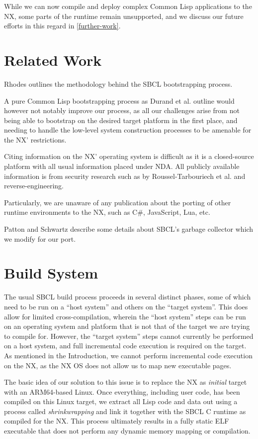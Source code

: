 \documentclass[format=sigconf]{acmart}
\begin{document}
While we can now compile and deploy complex Common Lisp applications to the NX, some parts of the runtime remain unsupported, and we discuss our future efforts in this regard in \autoref{further-work}.

\section{Related Work}\label{relatedwork}
Rhodes\cite{rhodes2008sbcl} outlines the methodology behind the SBCL bootstrapping process.

A pure Common Lisp bootstrapping process as Durand et al.\cite{durand2019bootstrapping} outline would however not notably improve our process, as all our challenges arise from not being able to bootstrap on the desired target platform in the first place, and needing to handle the low-level system construction processes to be amenable for the NX' restrictions.

Citing information on the NX' operating system is difficult as it is a closed-source platform with all usual information placed under NDA. All publicly available information is from security research such as by Roussel-Tarbouriech et al.\cite{roussel2019methodically} and reverse-engineering\cite{switchbrew}.

Particularly, we are unaware of any publication about the porting of other runtime environments to the NX, such as C\#, JavaScript, Lua, etc.

Patton\cite{patton2023parallel} and Schwartz\cite{schwartz2018dynamic} describe some details about SBCL's garbage collector which we modify for our port.

\section{Build System}\label{build}
The usual SBCL build process proceeds in several distinct phases, some of which need to be run on a ``host system'' and others on the ``target system''. This does allow for limited cross-compilation, wherein the ``host system'' steps can be run on an operating system and platform that is not that of the target we are trying to compile for. However, the ``target system'' steps cannot currently be performed on a host system, and full incremental code execution is required on the target. As mentioned in the Introduction, we cannot perform incremental code execution on the NX, as the NX OS does not allow us to map new executable pages.

The basic idea of our solution to this issue is to replace the NX as \textit{initial} target with an ARM64-based Linux. Once everything, including user code, has been compiled on this Linux target, we extract all Lisp code and data out using a process called \textit{shrinkwrapping} and link it together with the SBCL C runtime as compiled for the NX. This process ultimately results in a fully static ELF executable that does not perform any dynamic memory mapping or compilation.
\end{document}
